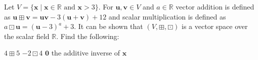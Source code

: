 
\begin{Exercise}[
name={},
title={}, 
difficulty=0,
origin={\cite{NS}}]
Let $V=\{\mathbf{x}\;|\;\mathbf{x}\in\mathbb{R}\text{ and }\mathbf{x}>3\}$.  For $\mathbf{u}, \mathbf{v}\in V$ and $a\in\mathbb{R}$ vector addition is defined as $\mathbf{u}\boxplus\mathbf{v}=\mathbf{u}\mathbf{v}-3(\mathbf{u}+\mathbf{v})+12$ and scalar multiplication is defined as $a\boxdot\mathbf{u}=(\mathbf{u}-3)^a+3$. It can be shown that $(V,\boxplus,\boxdot)$ is a vector space over the scalar field $\mathbb R$. Find the following:
\begin{multicols}{2}
\Question $4\boxplus 5$
\Question $-2\boxdot 4$
\Question $\mathbf{0}$
\Question the additive inverse of $\mathbf{x}$
\EndCurrentQuestion
\end{multicols}
\end{Exercise}

\begin{Answer}
\begin{multicols}{4}
\Question 
\Question 
\Question 
\Question
\EndCurrentQuestion
\end{multicols} 
\end{Answer}
